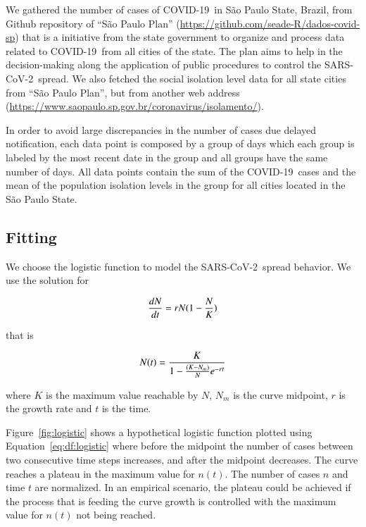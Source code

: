 \documentclass[review,3p,times]{elsarticle}
\def\covid{\hbox{COVID-19}} %
\def\sarscov{{SARS-CoV-2}}
\def\eq#1{Equation~#1}
\def\fig#1{Figure~#1}
\begin{document}
We gathered the number of cases of \covid\ 
in S\~{a}o Paulo State, Brazil, 
from Github repository of ``S\~{a}o Paulo Plan'' 
(\url{https://github.com/seade-R/dados-covid-sp}) 
that is a initiative from the state government 
to organize and process data related to \covid \
from all cities of the state. 
The plan aims to help in the decision-making 
along the application of public 
procedures to control the \sarscov\ spread. 
We also fetched the social isolation level data 
for all state cities  from 
``S\~{a}o Paulo Plan'', but from another web address 
(\url{https://www.saopaulo.sp.gov.br/coronavirus/isolamento/}).

In order to avoid large discrepancies 
in the number of cases due delayed notification, 
 each data point is composed by a group of days 
 which each group is labeled by the most 
 recent date in the group and 
 all groups have the same number of days. 
 All data points contain 
 the sum of the \covid\ cases and 
 the mean of the population isolation levels 
 in the group for all cities 
 located in the S\~{a}o Paulo State.

\subsection{Fitting}

We choose the logistic function to model 
the \sarscov\ spread behavior. We use the 
solution for

\begin{equation}
{dN \over dt} = r N (1 - {N \over K})
\label{eq:df:logistic}
\end{equation}

\noindent that is

\begin{equation}
N(t) = {K \over {1- {(K-N_{m}) \over N} e^{-rt}}}
\label{eq:exp:logistic}
\end{equation}

\noindent where $K$ is the maximum value reachable by $N$, 
$N_m$ is the curve midpoint, 
$r$ is the growth rate 
and $t$ is the time.

\fig{\ref{fig:logistic}} shows a hypothetical logistic function 
plotted using \eq{\ref{eq:df:logistic}} where before the midpoint 
the number of cases between 
two consecutive time steps increases, 
and after the midpoint decreases. 
The curve reaches a plateau in the maximum value for $n(t)$. 
The number of cases $n$ and time $t$ are normalized.
In an empirical scenario, the plateau could be achieved 
if the process that is feeding the curve 
growth is controlled with the maximum 
value for $n(t)$ not being reached.
\end{document}
